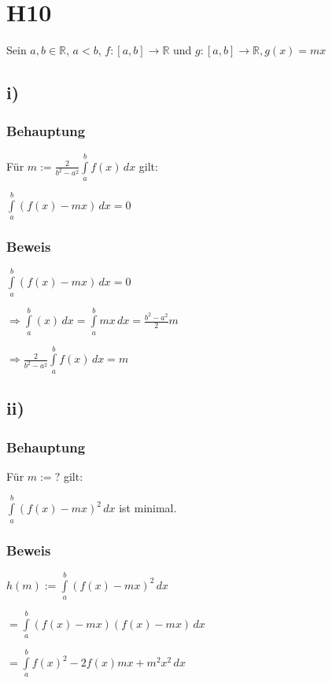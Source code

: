 \section*{H10}

Sein $a,b \in \mathbb{R}$, $a < b$, $f : [a,b] \to \mathbb{R}$ und $g:[a,b] \to \mathbb{R}, g(x)=mx$

\subsection*{i)}

\subsubsection*{Behauptung}

	Für $m := \frac{2}{b^{2}-a^{2}} \int\limits_{a}^{b}f(x) \,dx$ gilt:
	
	$\int\limits_{a}^{b}(f(x)-mx)\,dx = 0$
	
\subsubsection*{Beweis}

$\int\limits_{a}^{b}(f(x)-mx)\,dx = 0$

$\Rightarrow \int\limits_{a}^{b}(x)\,dx = \int\limits_{a}^{b}mx\,dx = \frac{b^{2}-a^{2}}{2}m$

$\Rightarrow \frac{2}{b^{2}-a^{2}} \int\limits_{a}^{b}f(x) \,dx = m$

\subsection*{ii)}

\subsubsection*{Behauptung}

Für $m := ?$ gilt:

$\int\limits_{a}^{b}(f(x)-mx)^{2}\,dx$ ist minimal.

\subsubsection*{Beweis}

$ h(m) := \int\limits_{a}^{b}(f(x)-mx)^{2}\,dx$

$ = \int\limits_{a}^{b}(f(x)-mx)(f(x)-mx)\,dx$


$ = \int\limits_{a}^{b}f(x)^{2}-2f(x)mx+m^{2}x^{2}\,dx$

